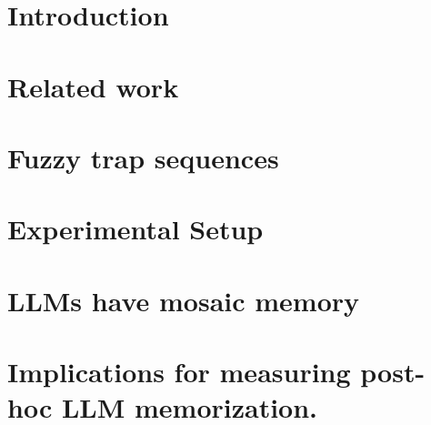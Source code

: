 \documentclass[twocolumn,10pt]{article}
\begin{document}
\section{Introduction}

\label{sec:introduction}

\section{Related work}

\label{sec:related_work}

\section{Fuzzy trap sequences}

\label{sec:method}

\section{Experimental Setup}

\label{sec:experimental_setup}


\section{LLMs have mosaic memory}

\label{sec:experiments}

\section{Implications for measuring post-hoc LLM memorization.}

\label{sec:naturally_occuring}
\end{document}
